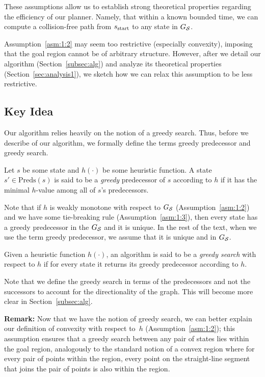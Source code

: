 \documentclass[a4paper]{report}
\begin{document}
These assumptions allow us to establish strong theoretical properties regarding the efficiency of our planner. Namely, that
within a known bounded time, we can compute a collision-free path from $s_{\textrm{start}}$ to any state in $G_\mathcal{S}$. 


Assumption~\ref{asm:1:2} may seem too restrictive (especially convexity), imposing that the goal region cannot be of arbitrary structure. However, after we detail our algorithm (Section~\ref{subsec:alg}) and analyze its theoretical properties (Section~\ref{sec:analysis1}), we sketch how we can relax this assumption to be less restrictive.


 
\subsection{Key Idea}
\label{sec:key}
Our algorithm relies heavily on the notion of a greedy search.  Thus, before we describe of our algorithm, we formally define the terms greedy predecessor and greedy search.

\vspace{2mm}
\begin{definition}
\label{def:greedy-suc}
  Let $s$ be some state and $h(\cdot)$ be some heuristic function.
  A state $s' \in \text{Preds}(s)$ is said to be a \emph{greedy} predecessor of $s$ according to $h$ if it has the minimal $h$-value among all of $s$'s predecessors.
\end{definition}
Note that 
if $h$ is weakly monotone with respect to $G_\mathcal{S}$
(Assumption~\ref{asm:1:2}) 
and we have some tie-breaking rule
(Assumption~\ref{asm:1:3}), then every state has a greedy predecessor in the $G_\mathcal{S}$ and it is unique.
In the rest of the text, when we use the term greedy predecessor, we assume that it is unique and in $G_\mathcal{S}$.

\vspace{2mm}
\begin{definition}
  Given a heuristic function $h(\cdot)$,
  an algorithm is said to be a \emph{greedy search}  with respect to $h$ if for every state it returns its greedy predecessor according to $h$.
\end{definition}
Note that we define the greedy search in terms of the predecessors and not the successors to account for the directionality of the graph. This will become more clear in Section~\ref{subsec:alg}.

\textbf{Remark:} Now that we have the notion of greedy search, we can better explain our definition of convexity with respect to~$h$ (Assumption~\ref{asm:1:2});
this assumption ensures that a greedy search between any pair of states lies within the goal region, analogously to the standard notion of a convex region where for every pair of points within the region, every point on the straight-line segment that joins the pair of points is also within the region.
\end{document}
